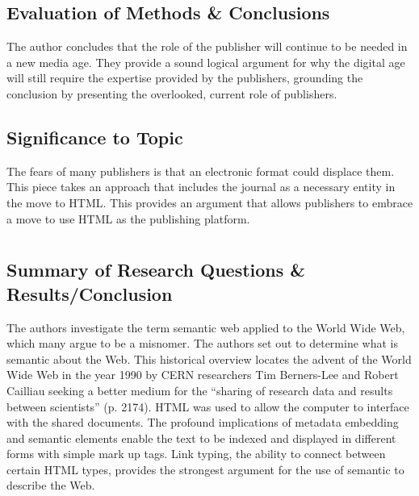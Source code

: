 \documentclass[leavefloats]{apa6e}\usepackage[]{graphicx}\usepackage[]{color}
\begin{document}
\subsection{Evaluation of Methods \& Conclusions} %
The author concludes that the role of the publisher will continue to be needed in a new media age.  They provide a sound logical argument for why the digital age will still require the expertise provided by the publishers, grounding the conclusion by presenting the overlooked, current role of publishers.

\subsection{Significance to Topic} %
The fears of many publishers is that an electronic format could displace them.  This piece takes an approach that includes the journal as a necessary entity in the move to HTML.  This provides an argument that allows publishers to embrace a move to use HTML as the publishing platform.


 \section{\textcite{Guns2013}}





\regpar



\subsection{Summary of Research Questions \& Results/Conclusion} %
The authors investigate the term semantic web applied to the World Wide Web, which many argue to be a misnomer.  The authors set out to determine what is semantic about the Web.  This historical overview locates the advent of the World Wide Web in the year 1990 by CERN researchers  Tim Berners-Lee and Robert Cailliau seeking a better medium for the ``sharing of research data and results between scientists'' (p. 2174).   HTML was used to allow the computer to interface with the shared documents.  The profound implications of metadata embedding and semantic elements enable the text to be indexed and displayed in different forms with simple mark up tags.  Link typing, the ability to connect between certain HTML types, provides the strongest argument for the use of semantic to describe the Web.
\end{document}
